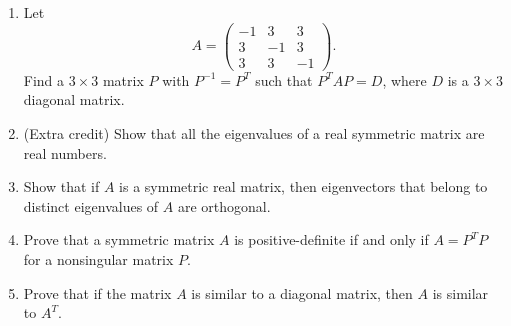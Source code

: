 \documentclass[12pt]{article}
\theoremstyle{remark}
\newtheorem*{solution}{Solution}
\newcommand{\inv}{^{-1}}
\renewcommand{\=}{&=&}
\newcommand{\<}{\langle}
\renewcommand{\>}{\rangle}
\newcommand{\bmat}{\begin{pmatrix}}
\newcommand{\emat}{\end{pmatrix}}
\begin{document}
\begin{problems}
\item
\begin{enumerate}
	\item Let $$A = \bmat -1 & 3 & 3 \\ 3 & -1 & 3 \\ 3 & 3 & -1 \emat.$$ Find a $3 \times 3$ 
	matrix $P$ with $P \inv = P^T$ such that $P^T A P = D$, where $D$ is a $3 \times 3$ 
	diagonal matrix.
	
	
	\item (Extra credit) Show that all the eigenvalues of a real symmetric matrix are real 
	numbers.
	
	
	\item Show that if $A$ is a symmetric real matrix, then eigenvectors that belong to 
	distinct eigenvalues of $A$ are orthogonal.
	
	
	\item Prove that a symmetric matrix $A$ is positive-definite if and only if $A = P^T P$
	for a nonsingular matrix $P$.
	
	
	\item Prove that if the matrix $A$ is similar to a diagonal matrix, then $A$ is similar to
	$A^T$.
	
\end{enumerate}




\end{problems}
\end{document}
